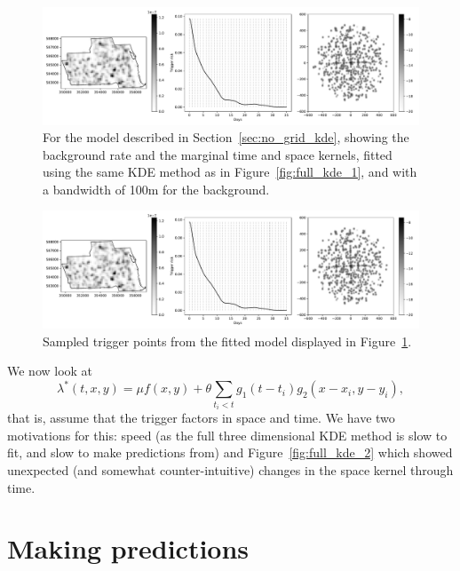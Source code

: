 \documentclass[twoside,a4paper]{article}
\theoremstyle{plain}
\theoremstyle{definition}
\begin{document}
\begin{figure}
  \includegraphics[width=\textwidth]{../notebooks/no_grid_kde_1.pdf}
  \caption{For the model described in Section~\ref{sec:no_grid_kde}, showing the background
rate and the marginal time and space kernels, fitted using the same KDE method as in
Figure~\ref{fig:full_kde_1}, and with a bandwidth of 100m for the background.}
  \label{fig:no_grid_kde_1}
\end{figure}

\begin{figure}
  \includegraphics[width=\textwidth]{../notebooks/no_grid_kde_1.pdf}
  \caption{Sampled trigger points from the fitted model displayed in
Figure~\ref{fig:no_grid_kde_1}.}
  \label{fig:no_grid_kde_1a}
\end{figure}


We now look at
\[ \lambda^*(t,x,y) = \mu f(x,y) + \theta \sum_{t_i < t} g_1(t-t_i) g_2(x-x_i, y-y_i), \]
that is, assume that the trigger factors in space and time.  We have two motivations for this:
speed (as the full three dimensional KDE method is slow to fit, and slow to make predictions
from) and Figure~\ref{fig:full_kde_2} which showed unexpected (and somewhat counter-intuitive)
changes in the space kernel through time.










\section{Making predictions}\label{sec:making_preds}
\end{document}
